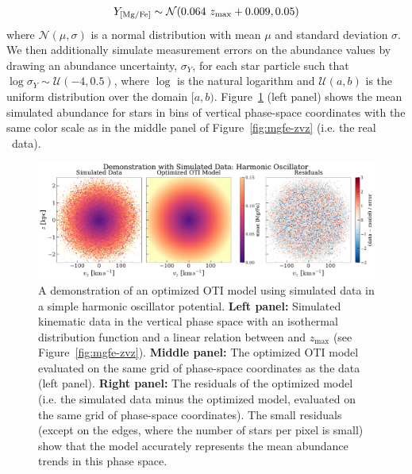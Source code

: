 \begin{equation}
    Y_{{[\mathrm{Mg}/\mathrm{Fe}]}} \sim \mathcal{N}(0.064~z_{\textrm{max}} + 0.009, 0.05)
\end{equation}
where $\mathcal{N}(\mu, \sigma)$ is a normal distribution with mean $\mu$ and standard
deviation $\sigma$.
We then additionally simulate measurement errors on the abundance values by drawing an
abundance uncertainty, $\sigma_Y$, for each star particle such that $\log \sigma_Y \sim
\mathcal{U}(-4, 0.5)$, where $\log$ is the natural logarithm and $\mathcal{U}(a, b)$ is
the uniform distribution over the domain $[a, b)$.
Figure~\ref{fig:sho-data-model} (left panel) shows the mean simulated 
abundance for stars in bins of vertical phase-space coordinates with the same color
scale as in the middle panel of Figure~\ref{fig:mgfe-zvz} (i.e. the real \apogee\ data).

\begin{figure}[t!]
\begin{center}
\includegraphics[width=\textwidth]{sho-data-model.pdf}
\end{center}
\caption{%
A demonstration of an optimized OTI model using simulated data in a simple harmonic
oscillator potential.
\textbf{Left panel:} Simulated kinematic data in the vertical phase space with an
isothermal distribution function and a linear relation between  and
$z_{\textrm{max}}$ (see Figure~\ref{fig:mgfe-zvz}).
\textbf{Middle panel:} The optimized OTI model evaluated on the same grid of phase-space
coordinates as the data (left panel).
\textbf{Right panel:} The residuals of the optimized model (i.e. the simulated data
minus the optimized model, evaluated on the same grid of phase-space coordinates).
The small residuals (except on the edges, where the number of stars per pixel is small) show that the model accurately represents the mean abundance trends in this phase space.
\label{fig:sho-data-model}
}
\end{figure}

